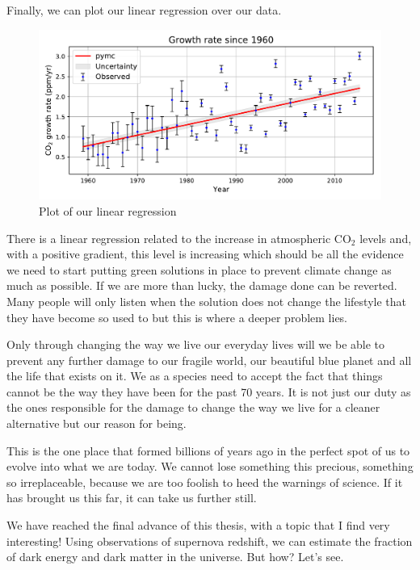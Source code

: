 \documentclass[12pt,twoside]{report}   %
\begin{document}
Finally, we can plot our linear regression over our data.
\begin{figure}[H]
\centering
\includegraphics[width = 6in]{FinalClimate.pdf}
\caption{Plot of our linear regression}
\label{figFinalGraph2}
\end{figure}

There is a linear regression related to the increase in atmospheric $\mathrm{CO_2}$ levels and, with a positive gradient, this level is increasing which should be all the evidence we need to start putting green solutions in place to prevent climate change as much as possible. If we are more than lucky, the damage done can be reverted. Many people will only listen when the solution does not change the lifestyle that they have become so used to but this is where a deeper problem lies.

Only through changing the way we live our everyday lives will we be able to prevent any further damage to our fragile world, our beautiful blue planet and all the life that exists on it. We as a species need to accept the fact that things cannot be the way they have been for the past 70 years. It is not just our duty as the ones responsible for the damage to change the way we live for a cleaner alternative but our reason for being. 

This is the one place that formed billions of years ago in the perfect spot of us to evolve into what we are today. We cannot lose something this precious, something so irreplaceable, because we are too foolish to heed the warnings of science. If it has brought us this far, it can take us further still.

We have reached the final advance of this thesis, with a topic that I find very interesting! Using observations of supernova redshift, we can estimate the fraction of dark energy and dark matter in the universe. But how? Let's see.
\end{document}
